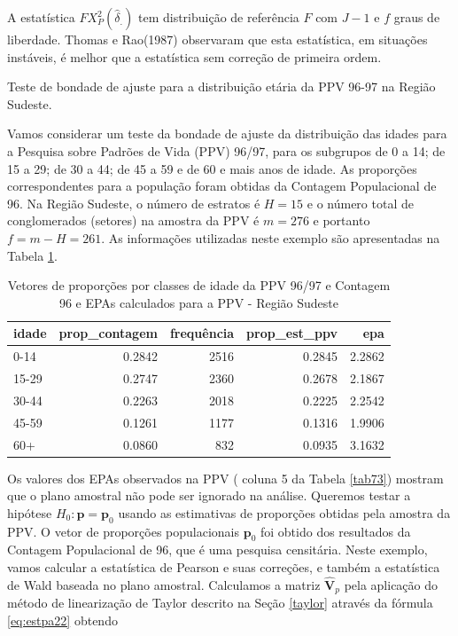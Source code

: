\documentclass[]{book}
\numberwithin{example}{chapter}
\numberwithin{remark}{chapter}
\numberwithin{definition}{chapter}
\let\BeginKnitrBlock\begin \let\EndKnitrBlock\end
\begin{document}
A estatística \(FX_{P}^{2}\left( \hat{\delta}_{.}\right)\) tem
distribuição de referência \(F\) com \(J-1\) e \(f\) graus de liberdade.
Thomas e Rao(1987) observaram que esta estatística, em situações
instáveis, é melhor que a estatística sem correção de primeira ordem.

\BeginKnitrBlock{example}
\protect\hypertarget{ex:unnamed-chunk-76}{}{\label{ex:unnamed-chunk-76}}Teste
de bondade de ajuste para a distribuição etária da PPV 96-97 na Região
Sudeste.
\EndKnitrBlock{example}

Vamos considerar um teste da bondade de ajuste da distribuição das
idades para a Pesquisa sobre Padrões de Vida (PPV) 96/97, para os
subgrupos de 0 a 14; de 15 a 29; de 30 a 44; de 45 a 59 e de 60 e mais
anos de idade. As proporções correspondentes para a população foram
obtidas da Contagem Populacional de 96. Na Região Sudeste, o número de
estratos é \(H=15\) e o número total de conglomerados (setores) na
amostra da PPV é \(m=276\) e portanto \(f=m-H=261\). As informações
utilizadas neste exemplo são apresentadas na Tabela \ref{tab:ppvcont}.

\begin{table}

\caption{\label{tab:ppvcont}Vetores de proporções por classes de idade da PPV 96/97 e Contagem
96 e EPAs calculados para a PPV - Região Sudeste}
\centering
\begin{tabular}[t]{lrrrr}
\toprule
idade & prop\_contagem & frequência & prop\_est\_ppv & epa\\
\midrule
0-14 & 0.2842 & 2516 & 0.2845 & 2.2862\\
15-29 & 0.2747 & 2360 & 0.2678 & 2.1867\\
30-44 & 0.2263 & 2018 & 0.2225 & 2.2542\\
45-59 & 0.1261 & 1177 & 0.1316 & 1.9906\\
60+ & 0.0860 & 832 & 0.0935 & 3.1632\\
\bottomrule
\end{tabular}
\end{table}

Os valores dos EPAs observados na PPV ( coluna 5 da Tabela \ref{tab73})
mostram que o plano amostral não pode ser ignorado na análise. Queremos
testar a hipótese \(H_{0}:\mathbf{p=p}_{0}\) usando as estimativas de
proporções obtidas pela amostra da PPV. O vetor de proporções
populacionais \(\mathbf{p}_{0}\) foi obtido dos resultados da Contagem
Populacional de 96, que é uma pesquisa censitária. Neste exemplo, vamos
calcular a estatística de Pearson e suas correções, e também a
estatística de Wald baseada no plano amostral. Calculamos a matriz
\(\widehat{\mathbf{V}}_{p}\) pela aplicação do método de linearização de
Taylor descrito na Seção \ref{taylor} através da fórmula
\eqref{eq:estpa22} obtendo
\end{document}

